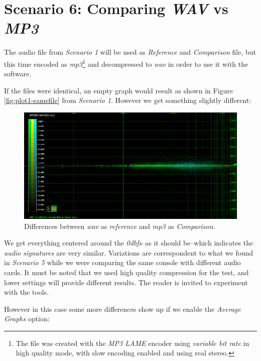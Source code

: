 \documentclass[10pt,a4paper]{report}
\newcommand{\ac}[1]{\textit{\acrshort{#1}}}
\newcommand{\db}[1]{\textit{#1\acrshort{dbfs}}}
\begin{document}
\section{Scenario 6: Comparing \textit{WAV} vs \textit{MP3}}
\label{mp3chap}

The audio file from \textit{Scenario 1} will be used as \textit{Reference} and \textit{Comparison} file, but this time encoded as \ac{mp3}\footnote{The file was created with the \textit{MP3 LAME} encoder using \textit{variable bit rate} in high quality mode, with slow encoding enabled and using real stereo.} and decompressed to \ac{wav} in order to use it with the software.

If the files were identical, an empty graph would result as shown in Figure \ref{fig:plot1-samefile} from \textit{Scenario 1}. However we get something slightly different:

\begin{figure}[H]
	\centering
	\includegraphics[width=1.0\linewidth]{images/interpretation/Plot6-mp3-1.png}
	\caption[WAV vs MP3]{Differences between \ac{wav} as \textit{reference} and \ac{mp3} as \textit{Comparison}.}
	\label{fig:plot6-mp3-1}
\end{figure}

We get everything centered around the \db{0}--as it should be--which indicates the \textit{audio signatures} are very similar. Variations are correspondent to what we found in \textit{Scenario 5} while we were comparing the same console with different audio cards. It must be noted that we used high quality compression for the test, and lower settings will provide different results. The reader is invited to experiment with the tools.

However in this case some more differences show up if we enable the \textit{Average Graphs} option:
\end{document}
